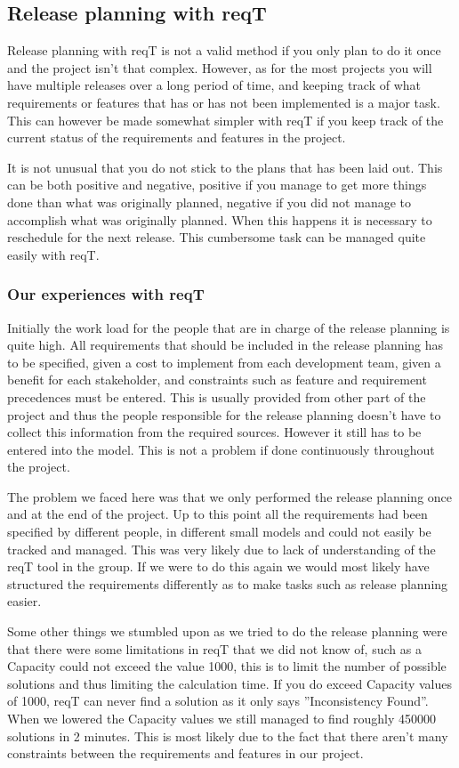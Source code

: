 \documentclass[a4paper]{article}
\begin{document}
		\subsection{Release planning with reqT}
			Release planning with reqT is not a valid method if you only plan to do it once and the project isn't that complex. However, as for the most projects you will have multiple releases over a long period of time, and keeping track of what requirements or features that has or has not been implemented is a major task. This can however be made somewhat simpler with reqT if you keep track of the current status of the requirements and features in the project.

			It is not unusual that you do not stick to the plans that has been laid out. This can be both positive and negative, positive if you manage to get more things done than what was originally planned, negative if you did not manage to accomplish what was originally planned. When this happens it is necessary to reschedule for the next release. This cumbersome task can be managed quite easily with reqT.

			\subsubsection{Our experiences with reqT}
				Initially the work load for the people that are in charge of the release planning is quite high. All requirements that should be included in the release planning has to be specified, given a cost to implement from each development team, given a benefit for each stakeholder, and constraints such as feature and requirement precedences must be entered. This is usually provided from other part of the project and thus the people responsible for the release planning doesn't have to collect this information from the required sources. However it still has to be entered into the model. This is not a problem if done continuously throughout the project.

				The problem we faced here was that we only performed the release planning once and at the end of the project. Up to this point all the requirements had been specified by different people, in different small models and could not easily be tracked and managed. This was very likely due to lack of understanding of the reqT tool in the group. If we were to do this again we would most likely have structured the requirements differently as to make tasks such as release planning easier.

				Some other things we stumbled upon as we tried to do the release planning were that there were some limitations in reqT that we did not know of, such as a Capacity could not exceed the value 1000, this is to limit the number of possible solutions and thus limiting the calculation time. If you do exceed Capacity values of 1000, reqT can never find a solution as it only says ''Inconsistency Found''. When we lowered the Capacity values we still managed to find roughly 450000 solutions in 2 minutes. This is most likely due to the fact that there aren't many constraints between the requirements and features in our project.
\end{document}
